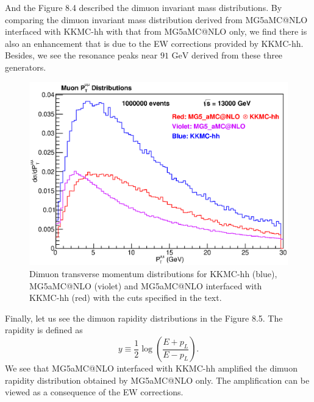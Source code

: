 And the Figure 8.4 described the dimuon invariant mass distributions. By comparing the dimuon invariant mass distribution derived from MG5\textunderscore aMC@NLO interfaced with KKMC-hh with that from MG5\textunderscore aMC@NLO only, we find there is also an enhancement that is due to the EW corrections provided by KKMC-hh. Besides, we see the resonance peaks near $91\text{ GeV}$ derived from these three generators.
\begin{figure}
	\begin{center}
		\includegraphics[scale=0.65]{PTLL.eps}
		\caption{ Dimuon transverse momentum distributions for KKMC-hh (blue), MG5\textunderscore aMC@NLO (violet) and MG5\textunderscore aMC@NLO interfaced with KKMC-hh (red) with the cuts specified in the text.  }
	\end{center}
\end{figure}

Finally, let us see the dimuon rapidity distributions in the Figure 8.5. The rapidity is defined as 
\begin{equation}
y\equiv\frac{1}{2}\log\left(\frac{E+p_L}{E-p_L}\right).
\end{equation}
We see that MG5\textunderscore aMC@NLO interfaced with KKMC-hh amplified the dimuon rapidity distribution obtained by MG5\textunderscore aMC@NLO only. The amplification can be viewed as a consequence of the EW corrections.


